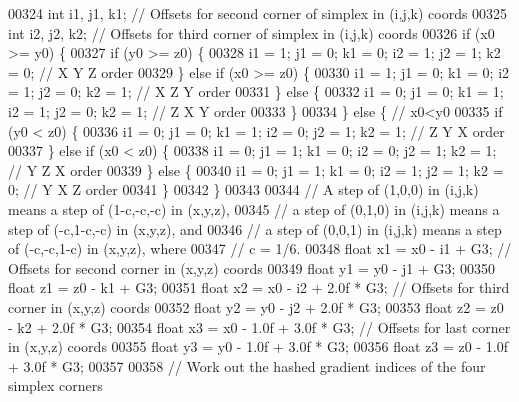 \begin{DoxyCode}
00324     \textcolor{keywordtype}{int} i1, j1, k1; \textcolor{comment}{// Offsets for second corner of simplex in (i,j,k) coords}
00325     \textcolor{keywordtype}{int} i2, j2, k2; \textcolor{comment}{// Offsets for third corner of simplex in (i,j,k) coords}
00326     \textcolor{keywordflow}{if} (x0 >= y0) \{
00327         \textcolor{keywordflow}{if} (y0 >= z0) \{
00328             i1 = 1; j1 = 0; k1 = 0; i2 = 1; j2 = 1; k2 = 0; \textcolor{comment}{// X Y Z order}
00329         \} \textcolor{keywordflow}{else} \textcolor{keywordflow}{if} (x0 >= z0) \{
00330             i1 = 1; j1 = 0; k1 = 0; i2 = 1; j2 = 0; k2 = 1; \textcolor{comment}{// X Z Y order}
00331         \} \textcolor{keywordflow}{else} \{
00332             i1 = 0; j1 = 0; k1 = 1; i2 = 1; j2 = 0; k2 = 1; \textcolor{comment}{// Z X Y order}
00333         \}
00334     \} \textcolor{keywordflow}{else} \{ \textcolor{comment}{// x0<y0}
00335         \textcolor{keywordflow}{if} (y0 < z0) \{
00336             i1 = 0; j1 = 0; k1 = 1; i2 = 0; j2 = 1; k2 = 1; \textcolor{comment}{// Z Y X order}
00337         \} \textcolor{keywordflow}{else} \textcolor{keywordflow}{if} (x0 < z0) \{
00338             i1 = 0; j1 = 1; k1 = 0; i2 = 0; j2 = 1; k2 = 1; \textcolor{comment}{// Y Z X order}
00339         \} \textcolor{keywordflow}{else} \{
00340             i1 = 0; j1 = 1; k1 = 0; i2 = 1; j2 = 1; k2 = 0; \textcolor{comment}{// Y X Z order}
00341         \}
00342     \}
00343 
00344     \textcolor{comment}{// A step of (1,0,0) in (i,j,k) means a step of (1-c,-c,-c) in (x,y,z),}
00345     \textcolor{comment}{// a step of (0,1,0) in (i,j,k) means a step of (-c,1-c,-c) in (x,y,z), and}
00346     \textcolor{comment}{// a step of (0,0,1) in (i,j,k) means a step of (-c,-c,1-c) in (x,y,z), where}
00347     \textcolor{comment}{// c = 1/6.}
00348     \textcolor{keywordtype}{float} x1 = x0 - i1 + G3; \textcolor{comment}{// Offsets for second corner in (x,y,z) coords}
00349     \textcolor{keywordtype}{float} y1 = y0 - j1 + G3;
00350     \textcolor{keywordtype}{float} z1 = z0 - k1 + G3;
00351     \textcolor{keywordtype}{float} x2 = x0 - i2 + 2.0f * G3; \textcolor{comment}{// Offsets for third corner in (x,y,z) coords}
00352     \textcolor{keywordtype}{float} y2 = y0 - j2 + 2.0f * G3;
00353     \textcolor{keywordtype}{float} z2 = z0 - k2 + 2.0f * G3;
00354     \textcolor{keywordtype}{float} x3 = x0 - 1.0f + 3.0f * G3; \textcolor{comment}{// Offsets for last corner in (x,y,z) coords}
00355     \textcolor{keywordtype}{float} y3 = y0 - 1.0f + 3.0f * G3;
00356     \textcolor{keywordtype}{float} z3 = z0 - 1.0f + 3.0f * G3;
00357 
00358     \textcolor{comment}{// Work out the hashed gradient indices of the four simplex corners}

\end{DoxyCode}
